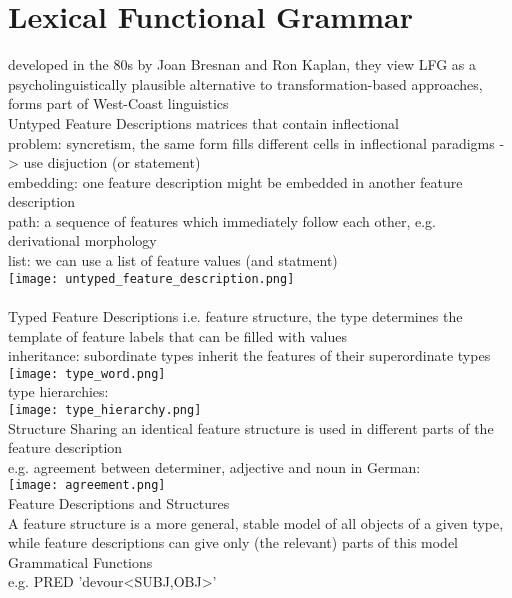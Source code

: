 \section{Lexical Functional Grammar}
{\tiny developed in the 80s by Joan Bresnan and Ron Kaplan, they view LFG as a psycholinguistically plausible alternative to transformation-based approaches, forms part of West-Coast linguistics}\\
\scriptsize{Untyped Feature Descriptions} {\tiny matrices that contain inflectional\\
problem: syncretism, the same form fills different cells in inflectional paradigms -> use disjuction (or statement)\\
embedding: one feature description might be embedded in another feature description\\
path: a sequence of features which immediately follow each other, e.g. derivational morphology\\
list: we can use a list of feature values (and statment)\\
\texttt{[image: untyped\_feature\_description.png]}\\
}\\
\scriptsize{Typed Feature Descriptions} {\tiny i.e. feature structure, the type determines the template of feature labels that can be filled with values \\
inheritance: subordinate types inherit the features of their superordinate types\\
\texttt{[image: type\_word.png]}\\
type hierarchies:\\
\texttt{[image: type\_hierarchy.png]}
}\\
\scriptsize{Structure Sharing} {\tiny an identical feature structure is used in different parts of the feature description\\
e.g. agreement between determiner, adjective and noun in German:\\
\texttt{[image: agreement.png]}\\
}
\scriptsize{Feature Descriptions and Structures}\\ 
{\tiny
A feature structure is a more general, stable model of all objects of a given type, while feature descriptions can give only (the relevant) parts of this model
}\\
\scriptsize{Grammatical Functions}\\ 
{\tiny e.g. PRED 'devour<SUBJ,OBJ>'}\\
